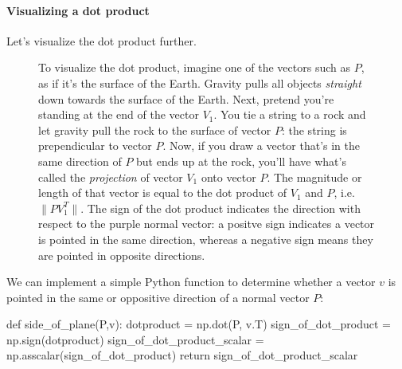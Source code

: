 \documentclass[12pt]{article}
\begin{document}
\paragraph{Visualizing a dot product} Let's visualize the dot product further.
\newpage
\begin{figure}
  \begin{center}
  \end{center}
  \caption{To visualize the dot product, imagine one of the vectors such as $P$, as if it's the surface of the Earth. Gravity pulls all objects \emph{straight} down towards the surface of the Earth. Next, pretend you're standing at the end of the vector $V_1$. You tie a string to a rock and let gravity pull the rock to the surface of vector $P$: the string is prependicular to vector $P$. Now, if you draw a vector that's in the same direction of $P$ but ends up at the rock, you'll have what's called the \emph{projection} of vector $V_1$ onto vector $P$. The magnitude or length of that vector is equal to the dot product of $V_1$ and $P$, i.e. $\|PV_1^T\|$. The sign of the dot product indicates the direction with respect to the purple normal vector: a positve sign indicates a vector is pointed in the same direction, whereas a negative sign means they are pointed in opposite directions.}
\end{figure}

We can implement a simple Python function to determine whether a vector $v$ is pointed in the same or oppositive direction of a normal vector $P$:

\begin{python}
def side_of_plane(P,v):
  dotproduct = np.dot(P, v.T)
  sign_of_dot_product = np.sign(dotproduct)
  sign_of_dot_product_scalar = np.asscalar(sign_of_dot_product)
  return sign_of_dot_product_scalar
\end{python}
\end{document}
